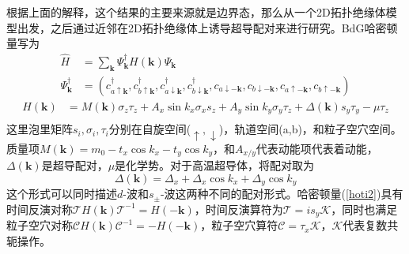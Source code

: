  根据上面的解释，这个结果的主要来源就是边界态，那么从一个2D拓扑绝缘体模型出发，之后通过近邻在2D拓扑绝缘体上诱导超导配对来进行研究。BdG哈密顿量写为
\begin{equation}
\begin{aligned}
\hat{H}&=\sum_\mathbf{k}\Psi_\mathbf{k}^\dagger H(\mathbf{k})\Psi_\mathbf{k}\\
\Psi^\dagger_\mathbf{k}&=(c^\dagger_{a\uparrow\mathbf{k}},c^\dagger_{b\uparrow\mathbf{k}},c^\dagger_{a\downarrow\mathbf{k}},c^\dagger_{b\downarrow\mathbf{k}},c_{a\downarrow\mathbf{-k}},c_{b\downarrow\mathbf{-k}},c_{a\uparrow\mathbf{-k}},c_{b\uparrow\mathbf{-k}})
\end{aligned}
\end{equation}
\begin{equation}
\begin{aligned}
H(\mathbf{k})&=M(\mathbf{k})\sigma_z\tau_z+A_x\sin k_x\sigma_xs_z+A_y\sin k_y\sigma_y\tau_z+\Delta(\mathbf{k})s_y\tau_y-\mu\tau_z\\\label{hoti2}
\end{aligned}
\end{equation}
这里泡里矩阵$s_i,\sigma_i,\tau_i$分别在自旋空间($\uparrow,\downarrow$)，轨道空间(a,b)，和粒子空穴空间。质量项$M(\mathbf{k})=m_0-t_x\cos k_x-t_y\cos k_y$，和$A_{x/y}$代表动能项代表着动能，$\Delta(\mathbf{k})$是超导配对，$\mu$是化学势。对于高温超导体，将配对取为
\begin{equation}
\Delta(\mathbf{k})=\Delta_x+\Delta_x\cos k_x+\Delta_y\cos k_y
\end{equation}
这个形式可以同时描述$d$-波和$s_\pm$-波这两种不同的配对形式。哈密顿量(\ref{hoti2})具有时间反演对称$\mathcal{T}H(\mathbf{k})\mathcal{T}^{-1}=H(-\mathbf{k})$，时间反演算符为$\mathcal{T}=is_y\mathcal{K}$，同时也满足粒子空穴对称$\mathcal{C}H(\mathbf{k})\mathcal{C}^{-1}=-H(-\mathbf{k})$，粒子空穴算符$\mathcal{C}=\tau_x\mathcal{K}$，$\mathcal{K}$代表复数共轭操作。

